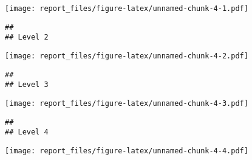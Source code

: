 \documentclass[]{article}
\begin{document}
\texttt{[image: report\_files/figure-latex/unnamed-chunk-4-1.pdf]}

\begin{verbatim}
## 
## Level 2
\end{verbatim}

\texttt{[image: report\_files/figure-latex/unnamed-chunk-4-2.pdf]}

\begin{verbatim}
## 
## Level 3
\end{verbatim}

\texttt{[image: report\_files/figure-latex/unnamed-chunk-4-3.pdf]}

\begin{verbatim}
## 
## Level 4
\end{verbatim}

\texttt{[image: report\_files/figure-latex/unnamed-chunk-4-4.pdf]}
\end{document}
